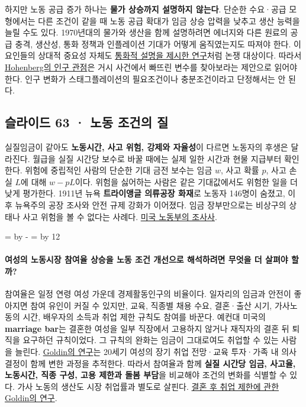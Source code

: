 \documentclass[10pt,a4paper]{article}
\newcommand{\ReserveQuestionSpace}{%
  \par\begingroup
  \dimen0=\pagegoal \advance\dimen0 by -\pagetotal
  \dimen2=\baselineskip \multiply\dimen2 by 12
  \ifdim\dimen0<\dimen2 \newpage\fi
  \endgroup}
\begin{document}
하지만 노동 공급 증가 하나는 \textbf{물가 상승까지 설명하지 않는다}. 단순한 수요·공급 모형에서는 다른 조건이 같을 때 노동 공급 확대가 임금 상승 압력을 낮추고 생산 능력을 늘릴 수도 있다. 1970년대의 물가와 생산을 함께 설명하려면 에너지와 다른 원료의 공급 충격, 생산성, 통화 정책과 인플레이션 기대가 어떻게 움직였는지도 따져야 한다. 이 요인들의 상대적 중요성 자체도 \href{https://www.nber.org/papers/w7547}{통화적 설명을 제시한 연구}처럼 논쟁 대상이다. 따라서 \href{https://www.cambridge.org/core/journals/journal-of-economic-history/article/abs/toward-a-more-useful-economic-history/3D2A2F355A48BB696645B287792223A9}{Hohenberg의 인구 관점}은 거시 사건에서 빠뜨린 변수를 찾아보라는 제안으로 읽어야 한다. 인구 변화가 스태그플레이션의 필요조건이나 충분조건이라고 단정해서는 안 된다.\par

\subsection{슬라이드 63 · 노동 조건의 질}
실질임금이 같아도 \textbf{노동시간, 사고 위험, 강제와 자율성}이 다르면 노동자의 후생은 달라진다. 월급을 실질 시간당 보수로 바꿀 때에는 실제 일한 시간과 현물 지급부터 확인한다. 위험에 중립적인 사람의 단순한 기대 금전 보수는 임금 $w$, 사고 확률 $p$, 사고 손실 $L$에 대해 $w-pL$이다. 위험을 싫어하는 사람은 같은 기대값에서도 위험한 일을 더 낮게 평가한다. 1911년 뉴욕 \textbf{트라이앵글 의류공장 화재}로 노동자 146명이 숨졌고, 이후 뉴욕주의 공장 조사와 안전 규제 강화가 이어졌다. 임금 장부만으로는 비상구의 상태나 사고 위험을 볼 수 없다는 사례다. \href{https://www.dol.gov/general/aboutdol/history/mono-regsafepart07}{미국 노동부의 조사사}.\par

\ReserveQuestionSpace
\paragraph{여성의 노동시장 참여율 상승을 노동 조건 개선으로 해석하려면 무엇을 더 살펴야 할까?}

참여율은 일정 연령 여성 가운데 경제활동인구의 비율이다. 일자리의 임금과 안전이 좋아지면 참여 유인이 커질 수 있지만, 교육, 직종별 채용 수요, 결혼·출산 시기, 가사노동의 시간, 배우자의 소득과 취업 제한 규칙도 참여를 바꾼다. 예컨대 미국의 \textbf{marriage bar}는 결혼한 여성을 일부 직장에서 고용하지 않거나 재직자의 결혼 뒤 퇴직을 요구하던 규칙이었다. 그 규칙의 완화는 임금이 그대로여도 취업할 수 있는 사람을 늘린다. \href{https://www.nber.org/papers/w11953}{Goldin의 연구}는 20세기 여성의 장기 취업 전망·교육 투자·가족 내 의사결정이 함께 변한 과정을 추적한다. 따라서 참여율과 함께 \textbf{실질 시간당 임금, 사고율, 노동시간, 직종 구성, 고용 제한과 돌봄 부담}을 비교해야 조건의 변화를 식별할 수 있다. 가사 노동의 생산도 시장 취업률과 별도로 살핀다. \href{https://www.nber.org/papers/w2747}{결혼 후 취업 제한에 관한 Goldin의 연구}.\par
\end{document}
